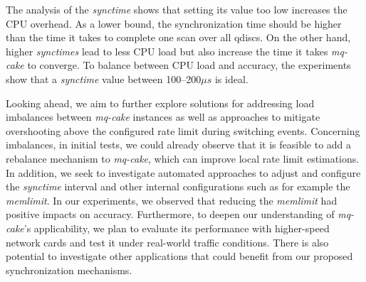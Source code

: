 %
The analysis of the \textit{synctime} shows that setting its value too low increases the CPU overhead.
%
As a lower bound, the synchronization time should be higher than the time it takes to complete one scan over all qdiscs.
%
On the other hand, higher \textit{synctimes} lead to less CPU load but also increase the time it takes \textit{mq-cake} to converge.
%
To balance between CPU load and accuracy, the experiments show that a \textit{synctime} value between 100--200$\mu s$ is ideal.

Looking ahead, we aim to further explore solutions for addressing load imbalances between \textit{mq-cake} instances as well as approaches to mitigate overshooting above the configured rate limit during switching events.
%
Concerning imbalances, in initial tests, we could already observe that it is feasible to add a rebalance mechanism to \textit{mq-cake}, which can improve local rate limit estimations.
%
In addition, we seek to investigate automated approaches to adjust and configure the \textit{synctime} interval and other internal configurations such as for example the \textit{memlimit}.
%
In our experiments, we observed that reducing the \textit{memlimit} had positive impacts on accuracy.
%
Furthermore, to deepen our understanding of \textit{mq-cake}'s applicability, we plan to evaluate its performance with higher-speed network cards and test it under real-world traffic conditions.
%
There is also potential to investigate other applications that could benefit from our proposed synchronization mechanisms.
